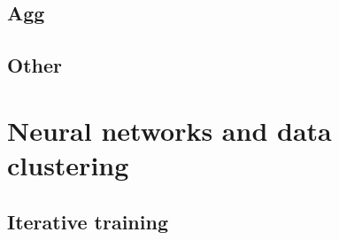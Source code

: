 \subsection{Agg}

\subsection{Other}

\section{Neural networks and data clustering}


\subsection{Iterative training}


